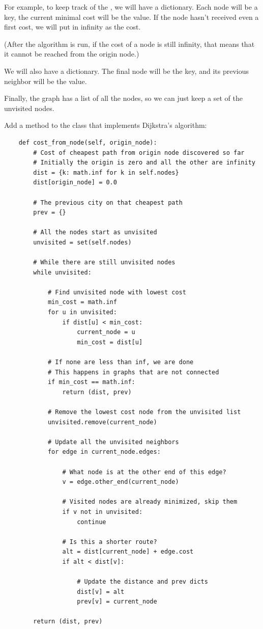 For example, to keep track of the , we will have a
 dictionary. Each node will be a key, the current minimal
cost will be the value.  If the node hasn't received even a first
cost, we will put in infinity as the cost.

(After the algorithm is run, if the cost of a node is still infinity,
that means that it cannot be reached from the origin node.)

We will also have a  dictionary. The final node will be
the key, and its previous neighbor will be the value.

Finally, the graph has a list of all the nodes, so we can just keep a
set of the unvisited nodes.

Add a method to the  class that implements Dijkstra's algorithm:
\begin{verbatim}
    def cost_from_node(self, origin_node):
        # Cost of cheapest path from origin node discovered so far
        # Initially the origin is zero and all the other are infinity
        dist = {k: math.inf for k in self.nodes}
        dist[origin_node] = 0.0

        # The previous city on that cheapest path
        prev = {}

        # All the nodes start as unvisited
        unvisited = set(self.nodes)
    
        # While there are still unvisited nodes
        while unvisited:

            # Find unvisited node with lowest cost
            min_cost = math.inf
            for u in unvisited:
                if dist[u] < min_cost:
                    current_node = u
                    min_cost = dist[u]

            # If none are less than inf, we are done
            # This happens in graphs that are not connected
            if min_cost == math.inf:
                return (dist, prev)
            
            # Remove the lowest cost node from the unvisited list
            unvisited.remove(current_node)

            # Update all the unvisited neighbors
            for edge in current_node.edges:

                # What node is at the other end of this edge?
                v = edge.other_end(current_node)

                # Visited nodes are already minimized, skip them
                if v not in unvisited:
                    continue

                # Is this a shorter route?
                alt = dist[current_node] + edge.cost
                if alt < dist[v]:

                    # Update the distance and prev dicts
                    dist[v] = alt
                    prev[v] = current_node

        return (dist, prev)
\end{verbatim}

